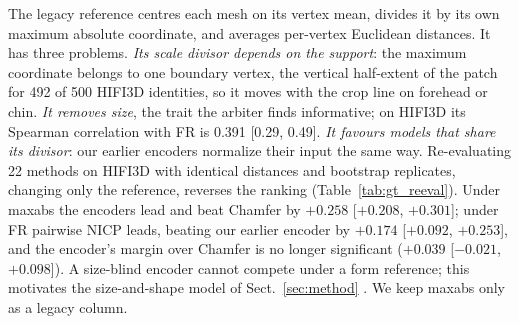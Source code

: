 The legacy reference centres each mesh on its vertex mean, divides it by its
own maximum absolute coordinate, and averages per-vertex Euclidean distances.
It has three problems. \emph{Its scale divisor depends on the support}: the
maximum coordinate belongs to one boundary vertex, the vertical half-extent
of the patch for 492 of 500 HIFI3D identities, so it moves with the crop line
on forehead or chin.
\emph{It removes size}, the trait the arbiter finds informative; on HIFI3D
its Spearman correlation with FR is 0.391 [0.29, 0.49].
\emph{It favours models that share its divisor}: our earlier encoders
normalize their input the same way.
Re-evaluating 22 methods on HIFI3D with identical distances and bootstrap
replicates, changing only the reference, reverses the ranking
(Table~\ref{tab:gt_reeval}). Under maxabs the encoders lead and beat Chamfer
by $+0.258$ [$+0.208$, $+0.301$]; under FR pairwise NICP leads, beating our
earlier encoder by $+0.174$ [$+0.092$, $+0.253$], and the encoder's margin over
Chamfer is no longer significant ($+0.039$ [$-0.021$, $+0.098$]). A size-blind
encoder cannot compete under a form reference; this motivates the
size-and-shape model of Sect.~\ref{sec:method} .
We keep maxabs only as a legacy column.

